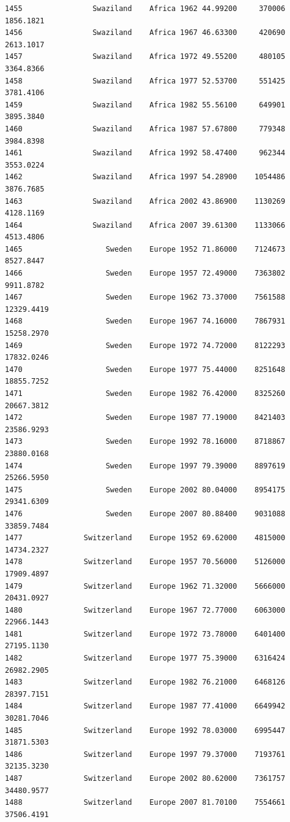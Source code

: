 \documentclass[
  letterpaper,
  DIV=11,
  numbers=noendperiod]{scrreprt}
\begin{document}
\begin{verbatim}
1455                Swaziland    Africa 1962 44.99200     370006   1856.1821
1456                Swaziland    Africa 1967 46.63300     420690   2613.1017
1457                Swaziland    Africa 1972 49.55200     480105   3364.8366
1458                Swaziland    Africa 1977 52.53700     551425   3781.4106
1459                Swaziland    Africa 1982 55.56100     649901   3895.3840
1460                Swaziland    Africa 1987 57.67800     779348   3984.8398
1461                Swaziland    Africa 1992 58.47400     962344   3553.0224
1462                Swaziland    Africa 1997 54.28900    1054486   3876.7685
1463                Swaziland    Africa 2002 43.86900    1130269   4128.1169
1464                Swaziland    Africa 2007 39.61300    1133066   4513.4806
1465                   Sweden    Europe 1952 71.86000    7124673   8527.8447
1466                   Sweden    Europe 1957 72.49000    7363802   9911.8782
1467                   Sweden    Europe 1962 73.37000    7561588  12329.4419
1468                   Sweden    Europe 1967 74.16000    7867931  15258.2970
1469                   Sweden    Europe 1972 74.72000    8122293  17832.0246
1470                   Sweden    Europe 1977 75.44000    8251648  18855.7252
1471                   Sweden    Europe 1982 76.42000    8325260  20667.3812
1472                   Sweden    Europe 1987 77.19000    8421403  23586.9293
1473                   Sweden    Europe 1992 78.16000    8718867  23880.0168
1474                   Sweden    Europe 1997 79.39000    8897619  25266.5950
1475                   Sweden    Europe 2002 80.04000    8954175  29341.6309
1476                   Sweden    Europe 2007 80.88400    9031088  33859.7484
1477              Switzerland    Europe 1952 69.62000    4815000  14734.2327
1478              Switzerland    Europe 1957 70.56000    5126000  17909.4897
1479              Switzerland    Europe 1962 71.32000    5666000  20431.0927
1480              Switzerland    Europe 1967 72.77000    6063000  22966.1443
1481              Switzerland    Europe 1972 73.78000    6401400  27195.1130
1482              Switzerland    Europe 1977 75.39000    6316424  26982.2905
1483              Switzerland    Europe 1982 76.21000    6468126  28397.7151
1484              Switzerland    Europe 1987 77.41000    6649942  30281.7046
1485              Switzerland    Europe 1992 78.03000    6995447  31871.5303
1486              Switzerland    Europe 1997 79.37000    7193761  32135.3230
1487              Switzerland    Europe 2002 80.62000    7361757  34480.9577
1488              Switzerland    Europe 2007 81.70100    7554661  37506.4191

\end{verbatim}
\end{document}
